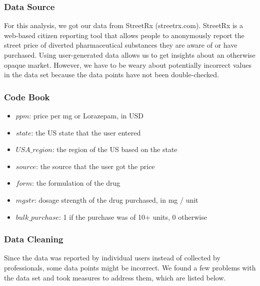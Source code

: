 \documentclass[
]{article}
\providecommand{\tightlist}{%
  \setlength{\itemsep}{0pt}\setlength{\parskip}{0pt}}
\begin{document}
\hypertarget{data-source}{%
\subsubsection{Data Source}\label{data-source}}

For this analysis, we got our data from StreetRx (streetrx.com).
StreetRx is a web-based citizen reporting tool that allows people to
anonymously report the street price of diverted pharmaceutical
substances they are aware of or have purchased. Using user-generated
data allows us to get insights about an otherwise opaque market.
However, we have to be weary about potentially incorrect values in the
data set because the data points have not been double-checked.

\hypertarget{code-book}{%
\subsubsection{Code Book}\label{code-book}}

\begin{itemize}
\tightlist
\item
  \(ppm\): price per mg or Lorazepam, in USD
\item
  \(state\): the US state that the user entered
\item
  \(USA\_region\): the region of the US based on the state
\item
  \(source\): the source that the user got the price
\item
  \(form\): the formulation of the drug
\item
  \(mgstr\): dosage strength of the drug purchased, in mg / unit
\item
  \(bulk\_purchase\): 1 if the purchase was of 10+ units, 0 otherwise
\end{itemize}

\hypertarget{data-cleaning}{%
\subsubsection{Data Cleaning}\label{data-cleaning}}

Since the data was reported by individual users instead of collected by
professionals, some data points might be incorrect. We found a few
problems with the data set and took measures to address them, which are
listed below.
\end{document}
